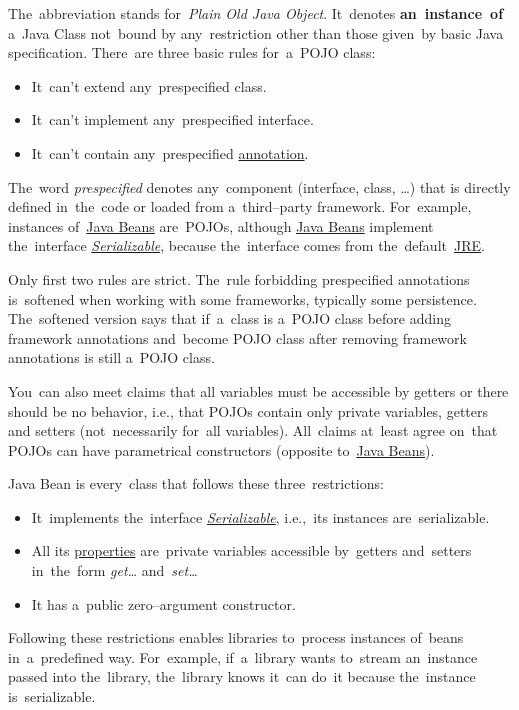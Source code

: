 \label{pojo}
The~abbreviation stands for~\textit{Plain Old Java Object}. It~denotes \textbf{an~instance~of} a~Java Class not~bound by any~restriction other than those given~by basic Java specification. There~are three basic rules for~a~POJO class:
\begin{itemize}
    \item It~can't extend any~prespecified class.
    \item It~can't implement any~prespecified interface.
    \item It~can't contain any~prespecified \hyperref[annotation]{annotation}.
\end{itemize}
\noindent The~word \textit{prespecified} denotes any~component (interface, class, \dots) that is directly defined in~the~code or loaded from a~third--party framework. For~example, instances of~\hyperref[javabeans]{Java Beans} are~POJOs, although \hyperref[javabeans]{Java Beans} implement the~interface \hyperref[serialization]{\textit{Serializable}}, because the~interface comes from the~default~\hyperref[jdkjrejvm]{JRE}.

\warning Only first two rules are strict. The~rule forbidding prespecified annotations is~softened when working with some frameworks, typically some persistence. The~softened version says that if~a~class is a~POJO class before adding framework annotations and~become POJO class after removing framework annotations is still a~POJO class.

\warning You~can also meet claims that all variables must be accessible by getters or there should be no behavior, i.e., that POJOs contain only private variables, getters and setters (not~necessarily for~all variables). All~claims at~least agree on~that POJOs can have parametrical constructors (opposite to~\hyperref[javabeans]{Java Beans}).

\label{javabeans}
Java Bean is every~class that follows these three~restrictions:
\begin{itemize}
    \item It~implements the~interface \hyperref[serialization]{\textit{Serializable}}, i.e.,~its instances are~serializable.
    \item All its \hyperref[variablefieldproperty]{properties} are~private variables accessible by~getters and~setters in~the~form \textit{get\dots} and~\textit{set\dots}
    \item It has a~public zero--argument constructor.
\end{itemize}
\noindent Following these restrictions enables libraries to~process instances of~beans in~a~predefined way. For~example, if~a~library wants to~stream an~instance passed into the~library, the~library knows it~can do~it because the~instance is~serializable.

